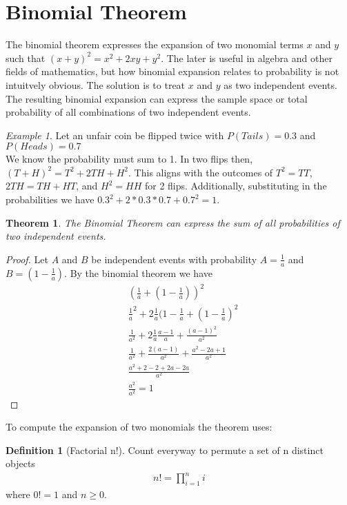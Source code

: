 \documentclass{article}
\theoremstyle{plain}
\newtheorem{theorem}{Theorem}
\theoremstyle{definition}
\newtheorem{definition}{Definition}
\theoremstyle{remark}
\newtheorem{example}{Example}
\begin{document}
\section{Binomial Theorem}
The binomial theorem expresses the expansion of two monomial terms $x$ and $y$ such that $(x + y)^2 = x^2 + 2xy + y^2$. The later is useful in algebra and other fields of mathematics, but how binomial expansion relates to probability is not intuitvely obvious. The solution is to treat $x$ and $y$ as two independent events. The resulting binomial expansion can express the sample space or total probability of all combinations of two independent events.
\begin{example}
  Let an unfair coin be flipped twice with $P(Tails) = 0.3$ and $P(Heads) = 0.7$ \\
  We know the probability must sum to 1. In two flips then, $(T + H)^2 = T^2 + 2TH + H^2$. This aligns with the outcomes of $T^2 = TT$, $2TH = TH + HT$, and $H^2 = HH$ for 2 flips. Additionally, substituting in the probabilities we have $0.3^2 + 2*0.3*0.7 + 0.7^2 = 1$.
\end{example}
\begin{theorem}
  The Binomial Theorem can express the sum of all probabilities of two independent events.
\end{theorem}
\begin{proof}
  Let $A$ and $B$ be independent events with probability $A = \frac{1}{a}$ and $B = (1 - \frac{1}{a})$. By the binomial theorem we have
  \begin{align*}
    &(\frac{1}{a} + (1-\frac{1}{a}))^2 \\
    &\frac{1}{a}^2 + 2\frac{1}{a}(1-\frac{1}{a} + (1-\frac{1}{a})^2 \\
    &\frac{1}{a^2} + 2\frac{1}{a}\frac{a-1}{a} + \frac{(a-1)^2}{a^2} \\
    &\frac{1}{a^2} + \frac{2(a-1)}{a^2} + \frac{a^2-2a+1}{a^2} \\
    &\frac{a^2+2-2+2a-2a}{a^2} \\
    &\frac{a^2}{a^2} = 1
  \end{align*}
\end{proof}
To compute the expansion of two monomials the theorem uses:
\begin{definition}[Factorial n!]
  Count everyway to permute a set of n distinct objects
  \begin{align*}
    n! = {\displaystyle\prod_{i=1}^{n}i}
  \end{align*}
  where $0! = 1$ and $n \geq 0$.
\end{definition}
\end{document}
